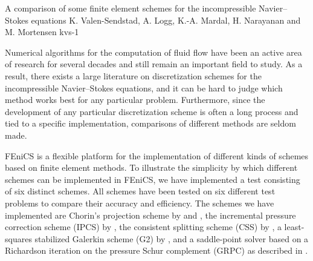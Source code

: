               {A comparison of some finite element schemes for the incompressible
                 Navier--Stokes equations}
              {K. Valen-Sendstad, A. Logg, K.-A. Mardal, H. Narayanan and
                M. Mortensen}
              {kvs-1}

\newcommand{\css}[1]{$\mathrm{CSS}_{#1}$}

\newcommand{\scheme}[3]{%
\begin{figure}
  \begin{center}
    \small
    \begin{tabular}{l}
      \hline
      \textbf{Scheme #1:} #2 \\
      \hline
      \begin{minipage}{0.9\textwidth}
        \vspace{0.1cm}
        \begin{enumerate}
          #3
        \end{enumerate}
        \vspace{0.1cm}
      \end{minipage} \\
      \hline
    \end{tabular}
    \normalsize
  \end{center}
\end{figure}}


Numerical algorithms for the computation of fluid flow have been an
active area of research for several decades and still remain an
important field to study. As a result, there exists a large literature
on discretization schemes for the incompressible Navier--Stokes
equations, and it can be hard to judge which method works best for any
particular problem. Furthermore, since the development of any
particular discretization scheme is often a long process and tied to a
specific implementation, comparisons of different methods are seldom
made.

FEniCS is a flexible platform for the implementation of different
kinds of schemes based on finite element methods. To illustrate the
simplicity by which different schemes can be implemented in FEniCS, we
have implemented a test consisting of six distinct schemes. All
schemes have been tested on six different test problems to compare
their accuracy and efficiency. The schemes we have implemented are
Chorin's projection scheme by \citet{Chorin1968} and
\citet{Temam1969}, the incremental pressure correction scheme (IPCS)
by \citet{Goda1979}, the consistent splitting scheme (CSS) by
\citet{GuermondMinevShen2006}, a least-squares stabilized Galerkin
scheme (G2) by \citet{HoffmanJohnson2007}, and a saddle-point solver
based on a Richardson iteration on the pressure Schur complement
(GRPC) as described in \citet{Turek1996}.

